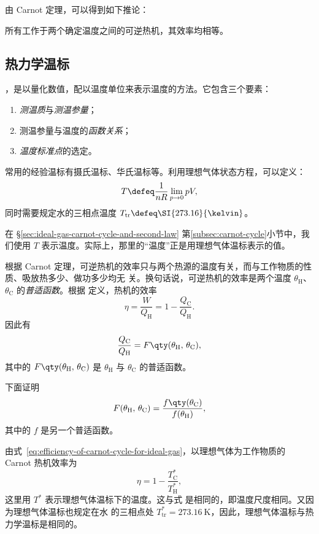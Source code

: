 由 Carnot 定理，可以得到如下推论：

\begin{theorem}
  所有工作于两个确定温度之间的可逆热机，其效率均相等。
\end{theorem}

\subsection{热力学温标}

，是以量化数值，配以温度单位来表示温度的方法。它包含三个要素：
\begin{enumerate}
  \item \emph{测温质}与\emph{测温参量}；
  \item 测温参量与温度的\emph{函数关系}；
  \item \emph{温度标准点}的选定。
\end{enumerate}

常用的经验温标有摄氏温标、华氏温标等。利用理想气体状态方程，可以定义：
\begin{equation}
  T \defeq \frac{1}{nR} \lim_{p \to 0} pV,
\end{equation}
同时需要规定水的三相点温度 $T_\text{tr} \defeq \SI{273.16}{\kelvin}$。

在 \S\ref{sec:ideal-gas-carnot-cycle-and-second-law} 第\ref{subsec:carnot-cycle}小节中，我们使用
$T$ 表示温度。实际上，那里的“温度”正是用理想气体温标表示的值。

根据 Carnot 定理，可逆热机的效率只与两个热源的温度有关，而与工作物质的性质、吸放热多少、做功多少均无
关。换句话说，可逆热机的效率是两个温度 $\theta_\text{H}$、$\theta_\text{C}$ 的\emph{普适函数}。根据
定义，热机的效率
\begin{equation}
  \eta = \frac{W}{Q_\text{H}} = 1 - \frac{Q_\text{C}}{Q_\text{H}}.
\end{equation}
因此有
\begin{equation}
  \frac{Q_\text{C}}{Q_\text{H}} = F\qty(\theta_\text{H}, \, \theta_\text{C}),
\end{equation}
其中的 $F\qty(\theta_\text{H}, \, \theta_\text{C})$ 是 $\theta_\text{H}$ 与
$\theta_\text{C}$ 的普适函数。

下面证明
\begin{equation}
  F(\theta_\text{H}, \, \theta_\text{C})
  = \frac{f\qty(\theta_\text{C})}{f(\theta_\text{H})},
\end{equation}
其中的 $f$ 是另一个普适函数。%

由式~\eqref{eq:efficiency-of-carnot-cycle-for-ideal-gas}，以理想气体为工作物质的 Carnot 热机效率为
\begin{equation}
  \eta = 1 - \frac{T^*_\text{C}}{T^*_\text{H}},
\end{equation}
这里用 $T^*$ 表示理想气体温标下的温度。这与式 是相同的，即温度尺度相同。又因为理想气体温标也规定在水
的三相点处 $T^*_\text{tr} = \SI{273.16}{\kelvin}$，因此，理想气体温标与热力学温标是相同的。

